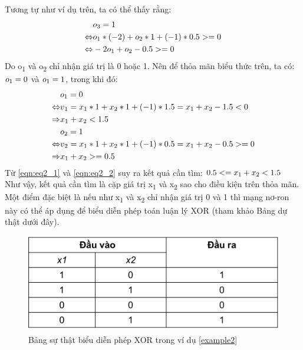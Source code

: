 \begin{answ}
Tương tự như ví dụ trên, ta có thể thấy rằng:
\begin{align}
  &o\textsubscript{3} = 1 \nonumber \\
  \Leftrightarrow  &o\textsubscript{1} * (-2) + o\textsubscript{2} * 1 + (-1)* 0.5 >= 0 \nonumber \\
  \Leftrightarrow  &-2o\textsubscript{1} + o\textsubscript{2} - 0.5 >= 0 \nonumber
\end{align}
Do o\textsubscript{1} và o\textsubscript{2} chỉ nhận giá trị là 0 hoặc 1. Nên để thỏa mãn biểu thức trên, ta có:
\(o\textsubscript{1} = 0\) và \(o\textsubscript{1} = 1\), trong khi đó:
\begin{align}
  &o\textsubscript{1} = 0 \nonumber\\
  \Leftrightarrow &v\textsubscript{1} = x\textsubscript{1} * 1 + x\textsubscript{2} * 1 + (-1) * 1.5 = x\textsubscript{1} + x\textsubscript{2} - 1.5 < 0 \nonumber\\
  \Rightarrow &x\textsubscript{1} + x\textsubscript{2} < 1.5 \label{eqn:eq2_1}\\
  &o\textsubscript{2} = 1 \nonumber\\
  \Leftrightarrow &v\textsubscript{2} = x\textsubscript{1} * 1 + x\textsubscript{2} * 1 + (-1) * 0.5 = x\textsubscript{1} + x\textsubscript{2} - 0.5 >= 0 \nonumber\\
  \Rightarrow &x\textsubscript{1} + x\textsubscript{2} >= 0.5 \label{eqn:eq2_2}
\end{align}
\noindent Từ \ref{eqn:eq2_1} và \ref{eqn:eq2_2} suy ra kết quả cần tìm: \( 0.5 <= x\textsubscript{1} + x\textsubscript{2} < 1.5\)\\

\noindent Như vậy, kết quả cần tìm là cặp giá trị x\textsubscript{1} và x\textsubscript{2} sao cho điều kiện trên thỏa mãn. Một điểm đặc biệt là nếu như x\textsubscript{1} và x\textsubscript{2} chỉ nhận giá trị 0 và 1 thì mạng nơ-ron này có thể áp dụng để biểu diễn phép toán luận lý XOR (tham khảo Bảng dự thật dưới đây).

\begin{figure}[h]
	\centering
		\includegraphics[width=0.6\columnwidth]{books/artificial-neural-network/chapter01/figure/bang su that XOR.png}
		\centering
	\caption{Bảng sự thật biểu diễn phép XOR trong ví dụ \ref{example2}}
\end{figure}
\end{answ}

